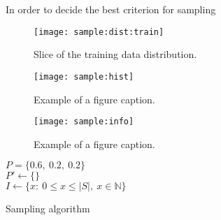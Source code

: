 \documentclass[conference]{IEEEtran}
\begin{document}
In order to decide the best criterion for sampling


\begin{figure}[h]
    \texttt{[image: sample:dist:train]}
    \caption{Slice of the training data distribution. \label{fig:sample:dist:train}}    
\end{figure}

\begin{figure*}[h]
    \texttt{[image: sample:hist]}
    \caption{Example of a figure caption. \label{fig:sample:hist}}
\end{figure*}

\begin{figure}[h]
    \texttt{[image: sample:info]}
    \caption{Example of a figure caption. \label{fig:sample:info}}
\end{figure}

\begin{algorithm}
    $P = \{0.6,\ 0.2,\ 0.2\}$\\
    $P' \gets \{\}$\\
    $I \gets \{x:\ 0\leq x\leq \lvert S\rvert,\ x\in\mathbb{N}\}$\\
    \caption{Sampling algorithm}\label{sampling:alg}
\end{algorithm}


\end{document}
